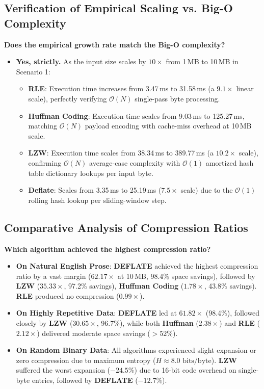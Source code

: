 \documentclass[12pt,a4paper]{article}
\begin{document}
\subsection{Verification of Empirical Scaling vs. Big-O Complexity}
\textbf{Does the empirical growth rate match the Big-O complexity?}
\begin{itemize}
    \item \textbf{Yes, strictly.} As the input size scales by $10\times$ from 1\,MB to 10\,MB in Scenario 1:
    \begin{itemize}
        \item \textbf{RLE}: Execution time increases from 3.47\,ms to 31.58\,ms (a $9.1\times$ linear scale), perfectly verifying $\mathcal{O}(N)$ single-pass byte processing.
        \item \textbf{Huffman Coding}: Execution time scales from 9.03\,ms to 125.27\,ms, matching $\mathcal{O}(N)$ payload encoding with cache-miss overhead at 10\,MB scale.
        \item \textbf{LZW}: Execution time scales from 38.34\,ms to 389.77\,ms (a $10.2\times$ scale), confirming $\mathcal{O}(N)$ average-case complexity with $\mathcal{O}(1)$ amortized hash table dictionary lookups per input byte.
        \item \textbf{Deflate}: Scales from 3.35\,ms to 25.19\,ms ($7.5\times$ scale) due to the $\mathcal{O}(1)$ rolling hash lookup per sliding-window step.
    \end{itemize}
\end{itemize}

\subsection{Comparative Analysis of Compression Ratios}
\textbf{Which algorithm achieved the highest compression ratio?}
\begin{itemize}
    \item \textbf{On Natural English Prose}: \textbf{DEFLATE} achieved the highest compression ratio by a vast margin ($\mathbf{62.17\times}$ at 10\,MB, 98.4\% space savings), followed by \textbf{LZW} ($35.33\times$, 97.2\% savings), \textbf{Huffman Coding} ($1.78\times$, 43.8\% savings). \textbf{RLE} produced no compression ($0.99\times$).
    \item \textbf{On Highly Repetitive Data}: \textbf{DEFLATE} led at $\mathbf{61.82\times}$ (98.4\%), followed closely by \textbf{LZW} ($30.65\times$, 96.7\%), while both \textbf{Huffman} ($2.38\times$) and \textbf{RLE} ($2.12\times$) delivered moderate space savings ($> 52\%$).
    \item \textbf{On Random Binary Data}: All algorithms experienced slight expansion or zero compression due to maximum entropy ($H \approx 8.0\text{ bits/byte}$). \textbf{LZW} suffered the worst expansion ($-24.5\%$) due to 16-bit code overhead on single-byte entries, followed by \textbf{DEFLATE} ($-12.7\%$).
\end{itemize}
\end{document}
